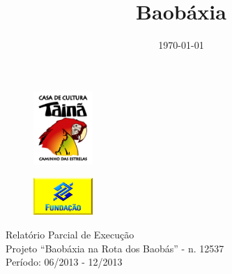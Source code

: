 \documentclass[a4paper, 11pt, oneside]{Relatorio_sem}  %
\begin{document}
\frontmatter	  %

\title  {Baobáxia}

\addresses  {\taina\\\npdd\\\redemocambos}  %
\date       {\today}
\subject    {Relatório de execução do projeto}

\maketitle

\setcounter{page}{1}
 
\begin{figure}[htbp]
  \centering
  \includegraphics[width=0.2\textwidth]{./Fig/Logo_Taina.pdf}
  \label{fig:LogoTaina}
\end{figure}
\begin{figure}[htbp]
  \centering
  \includegraphics[width=0.2\textwidth]{./Fig/Logo_FBB.pdf}
  \label{fig:LogoFBB}
\end{figure}

\begin{center}
\LARGE{Relatório Parcial de Execução}\\
\large{
  Projeto ``Baobáxia na Rota dos Baobás'' - n. 12537 \\
  Período: 06/2013 - 12/2013 
}

\end{center}
\end{document}
